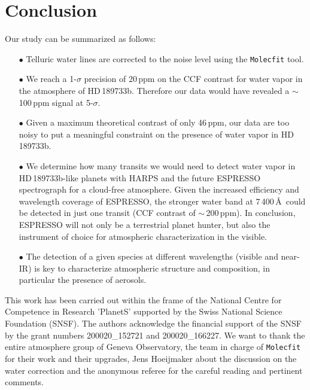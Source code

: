 \documentclass{aa}
\begin{document}

\section{Conclusion}
\label{conclusion}
Our study can be summarized as follows:
\begin{itemize}
\item[$\bullet$] Telluric water lines are corrected to the noise level using the \texttt{Molecfit} tool.
\item[$\bullet$] We reach a 1-$\sigma$ precision of 20\,ppm on the CCF contrast for water vapor in the atmosphere of HD\,189733b. Therefore our data would have revealed a $\sim$100\,ppm signal at 5-$\sigma$.
\item[$\bullet$] Given a maximum theoretical contrast of only 46\,ppm, our data are too noisy to put a meaningful constraint on the presence of water vapor in HD\,189733b.
\item[$\bullet$] We determine how many transits we would need to detect water vapor in HD\,189733b-like planets with HARPS and the future ESPRESSO spectrograph for a cloud-free atmosphere. Given the increased efficiency and wavelength coverage of ESPRESSO, the stronger water band at 7\,400\,\AA\ could be detected in just one transit (CCF contrast of $\sim$\,200\,ppm). In conclusion, ESPRESSO will not only be a terrestrial planet hunter, but also the instrument of choice for atmospheric characterization in the visible.
\item[$\bullet$] The detection of a given species at different wavelengths (visible and near-IR) is key to characterize atmospheric structure and composition, in particular the presence of aerosols.
\end{itemize}


\begin{acknowledgements}
This work has been carried out within the frame of the National Centre for Competence in Research 'PlanetS' supported by the Swiss National Science Foundation (SNSF). The authors acknowledge the financial support of the SNSF by the grant numbers 200020\_152721 and 200020\_166227. We want to thank the entire atmosphere group of Geneva Observatory, the team in charge of \texttt{Molecfit}  for their work and their upgrades, Jens Hoeijmaker about the discussion on the water correction and the anonymous referee for
the careful reading and pertinent comments.
\end{acknowledgements}


\end{document}
